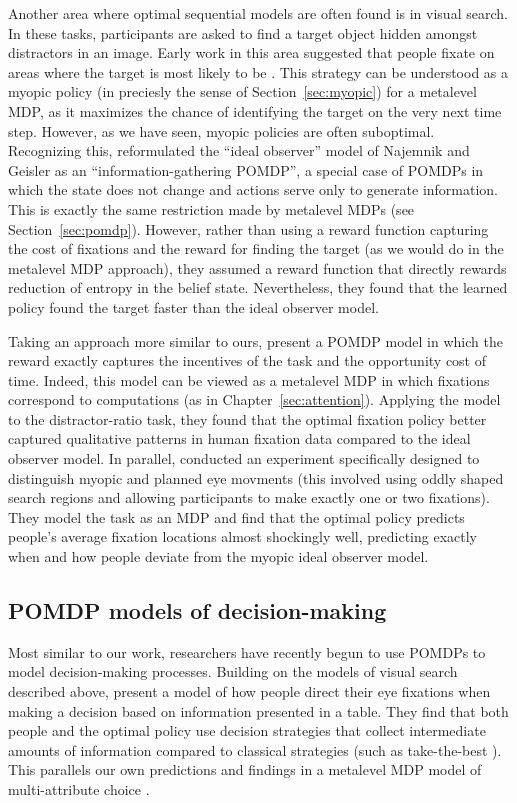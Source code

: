 Another area where optimal sequential models are often found is in visual search. In these tasks, participants are asked to find a target object hidden amongst distractors in an image. Early work in this area suggested that people fixate on areas where the target is most likely to be \citep{najemnik2005optimal}. This strategy can be understood as a myopic policy (in preciesly the sense of Section~\ref{sec:myopic}) for a metalevel MDP, as it maximizes the chance of identifying the target on the very next time step. However, as we have seen, myopic policies are often suboptimal. Recognizing this, \citet{butko2008ipomdp} reformulated the ``ideal observer'' model of Najemnik and Geisler as an ``information-gathering POMDP'', a special case of POMDPs in which the state does not change and actions serve only to generate information. This is exactly the same restriction made by metalevel MDPs (see Section~\ref{sec:pomdp}). However, rather than using a reward function capturing the cost of fixations and the reward for finding the target (as we would do in the metalevel MDP approach), they assumed a reward function that directly rewards reduction of entropy in the belief state. Nevertheless, they found that the learned policy found the target faster than the ideal observer model.

Taking an approach more similar to ours, \citet{acharya2017human} present a POMDP model in which the reward exactly captures the incentives of the task and the opportunity cost of time. Indeed, this model can be viewed as a metalevel MDP in which fixations correspond to computations (as in Chapter~\ref{sec:attention}). Applying the model to the distractor-ratio task, they found that the optimal fixation policy better captured qualitative patterns in human fixation data compared to the ideal observer model. In parallel, \citet{hoppe2019multistep} conducted an experiment specifically designed to distinguish myopic and planned eye movments (this involved using oddly shaped search regions and allowing participants to make exactly one or two fixations). They model the task as an MDP and find that the optimal policy predicts people's average fixation locations almost shockingly well, predicting exactly when and how people deviate from the myopic ideal observer model.

\subsection{POMDP models of decision-making}

Most similar to our work, researchers have recently begun to use POMDPs to model decision-making processes. Building on the models of visual search described above, \citet{chen2017cognitive} present a model of how people direct their eye fixations when making a decision based on information presented in a table. They find that both people and the optimal policy use decision strategies that collect intermediate amounts of information compared to classical strategies (such as take-the-best \citealp{gigerenzer1996reasoning}). This parallels our own predictions and findings in a metalevel MDP model of multi-attribute choice \citep{gul2018discovering}.

